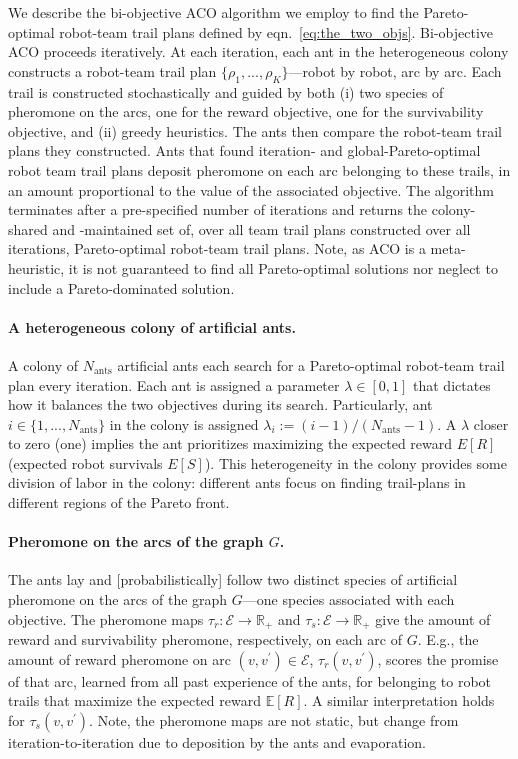 \documentclass[11pt, oneside]{article}
\begin{document}
We describe the bi-objective ACO \cite{iredi2001bi} algorithm we employ to find the Pareto-optimal robot-team trail plans defined by eqn.~\ref{eq:the_two_objs}. 
Bi-objective ACO proceeds iteratively. 
At each iteration, each ant in the heterogeneous colony constructs a robot-team trail plan $\{\rho_1, ..., \rho_K\}$---robot by robot, arc by arc.
Each trail is constructed stochastically and guided by both (i) two species of pheromone on the arcs, one for the reward objective, one for the survivability objective, and (ii) greedy heuristics. 
The ants then compare the robot-team trail plans they constructed. 
Ants that found iteration- and global-Pareto-optimal robot team trail plans deposit pheromone on each arc belonging to these trails, in an amount proportional to the value of the associated objective.
The algorithm terminates after a pre-specified number of iterations and returns the colony-shared and -maintained set of, over all team trail plans constructed over all iterations, Pareto-optimal robot-team trail plans. 
Note, as ACO is a meta-heuristic, it is not guaranteed to find all Pareto-optimal solutions nor neglect to include a Pareto-dominated solution. 

\paragraph{A heterogeneous colony of artificial ants.}
A colony of $N_{\text{ants}}$ artificial ants each search for a Pareto-optimal robot-team trail plan every iteration.
Each ant is assigned a parameter $\lambda \in [0, 1]$ that dictates how it balances the two objectives during its search.
Particularly, ant $i\in\{1, ..., N_{\text{ants}}\}$ in the colony is assigned $\lambda_i := (i-1) / (N_{\text{ants}}-1)$.
 A $\lambda$ closer to zero (one) implies the ant prioritizes maximizing the expected reward $E[R]$ (expected robot survivals $E[S]$). 
 This heterogeneity in the colony provides some division of labor in the colony: different ants focus on finding trail-plans in different regions of the Pareto front. 



\paragraph{Pheromone on the arcs of the graph $G$.}
The ants lay and [probabilistically] follow two distinct species of artificial pheromone on the arcs of the graph $G$---one species associated with each objective. 
The pheromone maps $\tau_r:\mathcal{E}\rightarrow \mathbb{R}_+$ and $\tau_s:\mathcal{E}\rightarrow \mathbb{R}_+$ give the amount of reward and survivability pheromone, respectively, on each arc of $G$.
E.g., the amount of reward pheromone on arc $(v, v^\prime)\in\mathcal{E}$, $\tau_r(v, v^\prime)$, scores the promise of that arc, learned from all past experience of the ants, for belonging to robot trails that maximize the expected reward $\mathbb{E}[R]$. A similar interpretation holds for $\tau_s(v, v^\prime)$. 
Note, the pheromone maps are not static, but change from iteration-to-iteration due to deposition by the ants and evaporation. 
\end{document}
